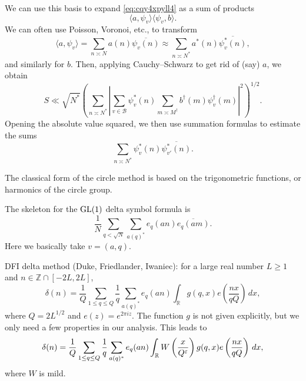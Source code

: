 \documentclass[reqno]{amsart} 
\begin{document}
We can use this basis to expand \eqref{eq:cqy4xpyll4} as a sum of products
\begin{equation*}
  \langle a, \psi_v \rangle \langle \psi_v, b \rangle.
\end{equation*}
We can often use Poisson, Voronoi, etc., to transform
\begin{equation*}
  \langle a, \psi_v \rangle = \sum_{n \asymp N} a(n) \overline{\psi_v(n)}
  \approx \sum_{n \asymp N^\ast} a^\ast(n) \overline{\psi_v^\ast(n)},
\end{equation*}
and similarly for $b$.  Then, applying Cauchy--Schwarz to get rid of (say) $a$, we obtain
\begin{equation*}
  S \ll \sqrt{N^\ast} \left( \sum_{n \asymp N^\ast} \left| \sum_{v \in \mathcal{B}} \psi_v^\ast(n) \sum_{m \asymp M^\dagger}
      b^\dagger(m) \psi_v^\dagger(m)\right|^2 \right)^{1/2}.
\end{equation*}
Opening the absolute value squared, we then use summation formulas to estimate the sums
\begin{equation*}
  \sum_{n \asymp N^\ast} \psi_v^\ast(n) \overline{\psi_{v '}^\ast(n)}.
\end{equation*}

The classical form of the circle method is based on the trigonometric functions, or harmonics of the circle group.

The skeleton for the $\operatorname{GL}(1)$ delta symbol formula is
\begin{equation*}
  \frac{1}{N}
  \sum_{q < \sqrt{N}}
  \sum_{a(q)^\ast}
  e_q(a n) \overline{e_q(a m)}.
\end{equation*}
Here we basically take $v = (a,q)$.

DFI delta method (Duke, Friedlander, Iwaniec): for a large real number $L \geq 1$ and $n \in \mathbb{Z} \cap[- 2 L, 2 L]$,
\begin{equation*}
  \delta(n) = \frac{1}{Q} \sum_{1 \leq q \leq Q} \frac{1}{q}
  \sum_{a(q)^\ast}
  e_q(a n)
  \int_{\mathbb{R}} g(q, x) e \left( \frac{n x}{q Q} \right) \, d x,
\end{equation*}
where $Q = 2 L^{1/2}$ and $e(z) = e^{2 \pi i z}$.  The function $g$ is not given explicitly, but we only need a few properties in our analysis.  This leads to
\begin{equation*}
  \delta(n) = \frac{1}{Q} \sum_{1 \leq q \leq Q} \frac{1}{q}
  \sum_{a(q)^\ast}
  e_q(a n)
  \int_{\mathbb{R}}
  W \left( \frac{x}{Q^\varepsilon} \right)
  g(q, x) e \left( \frac{n x}{q Q} \right) \, d x,
\end{equation*}
where $W$ is mild.
\end{document}
